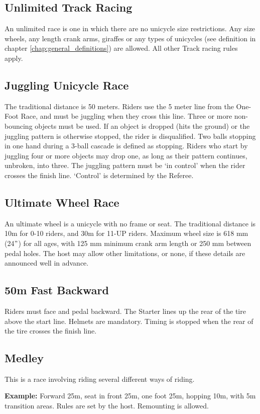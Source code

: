 \subsection{Unlimited Track Racing}

An unlimited race is one in which there are no unicycle size restrictions.
Any size wheels, any length crank arms, giraffes or any types of unicycles (see definition in chapter \ref{chap:general_definitions}) are allowed.
All other Track racing rules apply.

\subsection{Juggling Unicycle Race}

The traditional distance is 50 meters.
Riders use the 5 meter line from the One-Foot Race, and must be juggling when they cross this line.
Three or more non-bouncing objects must be used.
If an object is dropped (hits the ground) or the juggling pattern is otherwise stopped, the rider is disqualified.
Two balls stopping in one hand during a 3-ball cascade is defined as stopping.
Riders who start by juggling four or more objects may drop one, as long as their pattern continues, unbroken, into three.
The juggling pattern must be `in control' when the rider crosses the finish line.
`Control' is determined by the Referee.

\subsection{Ultimate Wheel Race}

An ultimate wheel is a unicycle with no frame or seat.
The traditional distance is 10m for 0-10 riders, and 30m for 11-UP riders.
Maximum wheel size is 618 mm (24$"$) for all ages, with 125 mm minimum crank arm length or 250 mm between pedal holes.
The host may allow other limitations, or none, if these details are announced well in advance.

\subsection{50m Fast Backward}

Riders must face and pedal backward.
The Starter lines up the rear of the tire above the start line.
Helmets are mandatory.
Timing is stopped when the rear of the tire crosses the finish line.

\subsection{Medley}

This is a race involving riding several different ways of riding.

\textbf{Example:} Forward 25m, seat in front 25m, one foot 25m, hopping 10m, with 5m transition areas.
Rules are set by the host.
Remounting is allowed.


